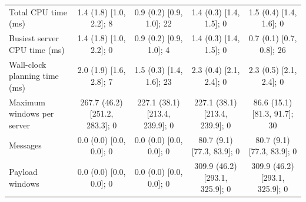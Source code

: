 \begin{table}[t]
\begin{tabular}{lcccc}
Total CPU time (ms) & 1.4 (1.8) [1.0, 2.2]; 8 & 0.9 (0.2) [0.9, 1.0]; 22 & 1.4 (0.3) [1.4, 1.5]; 0 & 1.5 (0.4) [1.4, 1.6]; 0 \\
Busiest server CPU time (ms) & 1.4 (1.8) [1.0, 2.2]; 0 & 0.9 (0.2) [0.9, 1.0]; 4 & 1.4 (0.3) [1.4, 1.5]; 0 & 0.7 (0.1) [0.7, 0.8]; 26 \\
Wall-clock planning time (ms) & 2.0 (1.9) [1.6, 2.8]; 7 & 1.5 (0.3) [1.4, 1.6]; 23 & 2.3 (0.4) [2.1, 2.4]; 0 & 2.3 (0.5) [2.1, 2.4]; 0 \\
Maximum windows per server & 267.7 (46.2) [251.2, 283.3]; 0 & 227.1 (38.1) [213.4, 239.9]; 0 & 227.1 (38.1) [213.4, 239.9]; 0 & 86.6 (15.1) [81.3, 91.7]; 30 \\
Messages & 0.0 (0.0) [0.0, 0.0]; 0 & 0.0 (0.0) [0.0, 0.0]; 0 & 80.7 (9.1) [77.3, 83.9]; 0 & 80.7 (9.1) [77.3, 83.9]; 0 \\
Payload windows & 0.0 (0.0) [0.0, 0.0]; 0 & 0.0 (0.0) [0.0, 0.0]; 0 & 309.9 (46.2) [293.1, 325.9]; 0 & 309.9 (46.2) [293.1, 325.9]; 0 \\
\bottomrule
\end{tabular}
\end{table}

